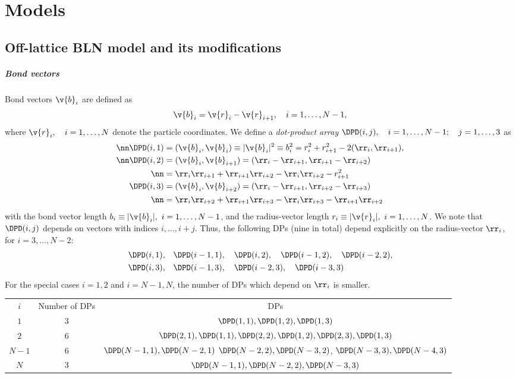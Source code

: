 \chapter{Models}

\section{Off-lattice BLN model and its modifications}

\paragraph{Bond vectors}

Bond vectors $\v{b}_i$ are defined as 
\begin{equation}
  \v{b}_i=\v{r}_i-\v{r}_{i+1},\quad i=1,\ldots,N-1,
  \label{bln-def-bv}
\end{equation}
where $\v{r}_i,\quad i=1,\ldots,N$ denote the particle coordinates. We define
a \emph{dot-product array} $\DPD(i,j),\quad i=1,\ldots, N-1;\quad j=1,\ldots,3$ as
\begin{align}
  \nn\DPD(i,1)&=(\v{b}_i,\v{b}_i)\equiv |\v{b}_i|^2\equiv b_i^2=r_i^2+r_{i+1}^2-2(\rr_i,\rr_{i+1}),\\
  \nn\DPD(i,2)&=(\v{b}_i,\v{b}_{i+1})=(\rr_i-\rr_{i+1},\rr_{i+1}-\rr_{i+2})\\
\nn&=\rr_i\rr_{i+1}+\rr_{i+1}\rr_{i+2}-\rr_i\rr_{i+2}-r_{i+1}^2\\
  \DPD(i,3)&=(\v{b}_i,\v{b}_{i+2})=(\rr_i-\rr_{i+1},\rr_{i+2}-\rr_{i+3})\\
\nn&=\rr_i\rr_{i+2}+\rr_{i+1}\rr_{i+3}-\rr_{i}\rr_{i+3}-\rr_{i+1}\rr_{i+2}
  \label{bln-def-dpd}
\end{align}
with the bond vector length $b_i\equiv|\v{b}_i|,\ i=1,\ldots,N-1$, 
and the radius-vector length $r_i\equiv|\v{r}_i|,\ i=1,\ldots,N$.
We note that $\DPD(i,j)$ depends on vectors with indices $i,\ldots,i+j$. Thus,
the following DPs (nine in total) depend explicitly on the radius-vector $\rr_i$, for $i=3,\ldots,N-2$:
\begin{align*}
 \DPD(i,1),&\quad\DPD(i-1,1),\quad\DPD(i,2),\quad\DPD(i-1,2),\quad\DPD(i-2,2),\\ 
 \DPD(i,3),&\quad\DPD(i-1,3),\quad\DPD(i-2,3),\quad\DPD(i-3,3)
\end{align*}
For the special cases $i=1,2$ and $i=N-1,N$, the number of DPs which 
depend on $\rr_i$ is smaller. 
\begin{table}
  \centering
  \begin{tabular}{ccc}
   $i$ 		& Number of DPs		&	DPs \\ 
   $1$		& 3			&	$\DPD(1,1),\DPD(1,2),\DPD(1,3)$ \\
   $2$		& 6			&	$\DPD(2,1),\DPD(1,1),\DPD(2,2),\DPD(1,2),\DPD(2,3),\DPD(1,3)$ \\
   $N-1$	& 6			&	$\DPD(N-1,1),\DPD(N-2,1)$
						$\DPD(N-2,2),\DPD(N-3,2)$,
						$\DPD(N-3,3),\DPD(N-4,3)$	\\	
   $N$		& 3			&	$\DPD(N-1,1),\DPD(N-2,2),\DPD(N-3,3)$ \\
  \end{tabular}
\end{table}
